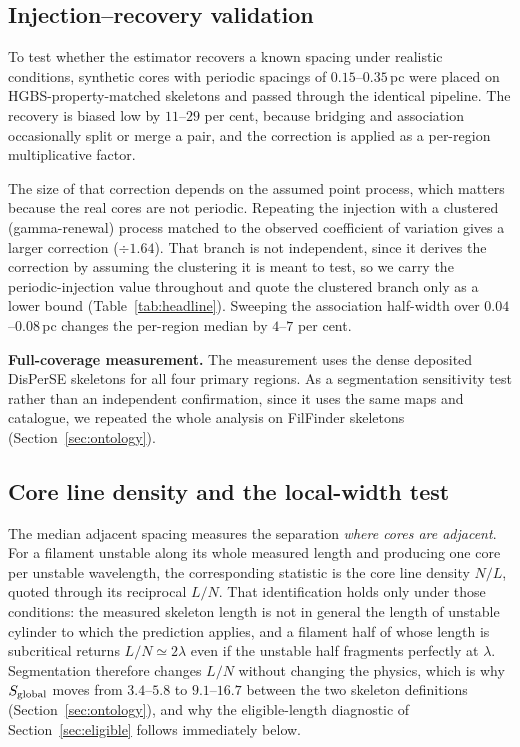 \documentclass[usenatbib,twoside,twocolumn]{mnras}
\begin{document}
\subsection{Injection--recovery validation}
\label{sec:injection_recovery}

To test whether the estimator recovers a known spacing under realistic conditions, synthetic cores with periodic spacings of $0.15$--$0.35$\,pc were placed on HGBS-property-matched skeletons and passed through the identical pipeline. The recovery is biased low by $11$--$29$ per cent, because bridging and association occasionally split or merge a pair, and the correction is applied as a per-region multiplicative factor.

The size of that correction depends on the assumed point process, which matters because the real cores are not periodic. Repeating the injection with a clustered (gamma-renewal) process matched to the observed coefficient of variation gives a larger correction ($\div1.64$). That branch is not independent, since it derives the correction by assuming the clustering it is meant to test, so we carry the periodic-injection value throughout and quote the clustered branch only as a lower bound (Table~\ref{tab:headline}). Sweeping the association half-width over $0.04$--$0.08$\,pc changes the per-region median by $4$--$7$ per cent.

\smallskip\noindent\textbf{Full-coverage measurement.} The measurement uses the dense deposited DisPerSE skeletons for all four primary regions. As a segmentation sensitivity test rather than an independent confirmation, since it uses the same maps and catalogue, we repeated the whole analysis on FilFinder skeletons (Section~\ref{sec:ontology}).



\subsection{Core line density and the local-width test}
\label{sec:linedensity}

The median adjacent spacing measures the separation \emph{where cores are adjacent}. For a filament unstable along its whole measured length and producing one core per unstable wavelength, the corresponding statistic is the core line density $N/L$, quoted through its reciprocal $L/N$. That identification holds only under those conditions: the measured skeleton length is not in general the length of unstable cylinder to which the prediction applies, and a filament half of whose length is subcritical returns $L/N\simeq2\lambda$ even if the unstable half fragments perfectly at $\lambda$. Segmentation therefore changes $L/N$ without changing the physics, which is why $S_{\rm global}$ moves from $3.4$--$5.8$ to $9.1$--$16.7$ between the two skeleton definitions (Section~\ref{sec:ontology}), and why the eligible-length diagnostic of Section~\ref{sec:eligible} follows immediately below.
\end{document}
